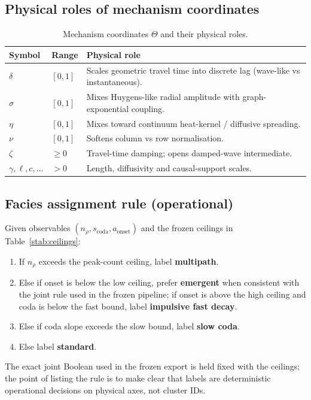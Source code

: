 \documentclass[twocolumn,10pt]{article}
\begin{document}
\subsection*{Physical roles of mechanism coordinates}
\begin{table}[!ht]
\centering
\caption{Mechanism coordinates \(\Theta\) and their physical roles.}
\label{stab:theta}
\begin{tabular}{llp{7.5cm}}
\toprule
Symbol & Range & Physical role \\
\midrule
\(\delta\) & \([0,1]\) & Scales geometric travel time into discrete lag
 (wave-like vs instantaneous). \\
\(\sigma\) & \([0,1]\) & Mixes Huygens-like radial amplitude with
 graph-exponential coupling. \\
\(\eta\) & \([0,1]\) & Mixes toward continuum heat-kernel / diffusive
 spreading. \\
\(\nu\) & \([0,1]\) & Softens column vs row normalisation. \\
\(\zeta\) & \(\ge0\) & Travel-time damping; opens damped-wave intermediate. \\
\(\gamma,\ell,c,\ldots\) & \(>0\) & Length, diffusivity and causal-support
 scales. \\
\bottomrule
\end{tabular}
\end{table}

\subsection*{Facies assignment rule (operational)}
Given observables \((n_{\rho}, s_{\mathrm{coda}}, a_{\mathrm{onset}})\) and the
frozen ceilings in Table~\ref{stab:ceilings}:
\begin{enumerate}
\item If \(n_{\rho}\) exceeds the peak-count ceiling, label \textbf{multipath}.
\item Else if onset is below the low ceiling, prefer \textbf{emergent} when
consistent with the joint rule used in the frozen pipeline; if onset is above
the high ceiling and coda is below the fast bound, label
\textbf{impulsive fast decay}.
\item Else if coda slope exceeds the slow bound, label \textbf{slow coda}.
\item Else label \textbf{standard}.
\end{enumerate}
The exact joint Boolean used in the frozen export is held fixed with the
ceilings; the point of listing the rule is to make clear that labels are
deterministic operational decisions on physical axes, not cluster IDs.
\end{document}
